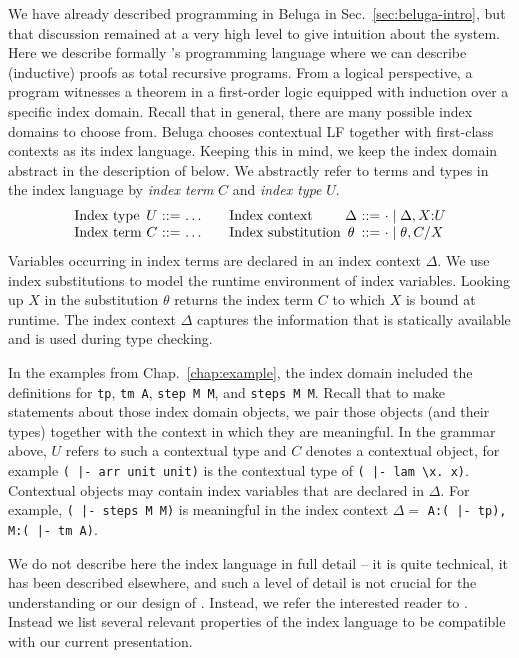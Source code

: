 We have already described programming in Beluga in Sec.~\ref{sec:beluga-intro},
but that discussion remained at a very high level to give intuition about the
system.
Here we describe formally \Beluga's programming language where we can
describe (inductive) proofs as total recursive programs.
From a logical perspective, a \Beluga{} program witnesses a theorem in a
first-order logic equipped with induction over a specific index domain.
Recall that in general, there are many possible index domains to choose from.
Beluga chooses contextual LF together with first-class contexts as its index
language.
Keeping this in mind, we keep the index domain abstract in the
description of \Beluga{} below. We abstractly refer to terms and types
in the index language by \emph{index term} $C$ and \emph{index type}
$U$.
%
\[
  \begin{array}{l@{~}c@{~}r@{~}l@{~~~~~~}l@{~}c@{~}r@{~}l}
  \mbox{Index type} & U & ::= & \ldots  &
    \mbox{Index context} & {\Delta} & ::= & {\cdot \galt \Delta, X{:}U}\\
  \mbox{Index term} & {C} & ::= & {\ldots}    &
    \mbox{Index substitution} & {\theta} & ::= & {\cdot \galt \theta, C/X}
  \end{array}
\]
%
Variables occurring in index terms are declared in an index context
$\Delta$. We use index substitutions to model the runtime environment of index
variables. Looking up $X$ in the substitution $\theta$ returns the
index term $C$ to which $X$ is bound at runtime. The index context
$\Delta$ captures the information that is statically available and is
used during type checking.

In the examples from Chap.~\ref{chap:example}, the index domain included the
definitions for \lstinline!tp!, \lstinline!tm A!, \lstinline!step M M!, and
\lstinline!steps M M!.
Recall that to make statements about those index domain objects, we pair those
objects (and their types) together with the context in which they are meaningful.
In the grammar above, $U$ refers to such a contextual type and $C$ denotes a
contextual object, for example
\lstinline!( |- arr unit unit)! is the contextual type of
\lstinline!( |- lam \x. x)!.
Contextual objects may contain index
variables that are declared in $\Delta$. For example,
\lstinline!( |- steps M M)! is meaningful in the index context
$\Delta = $ \lstinline!A:( |- tp), M:( |- tm A)!.

We do not describe here the index language in full detail -- it is quite
technical, it has been described elsewhere, and such a level of detail is not
crucial for the understanding or our design of \Harpoon.
Instead, we refer the interested reader to
\cite{Thibodeau:ICFP16,JacobRao:stratified2018}.
Instead we list several relevant properties of the index language to be
compatible with our current presentation.

